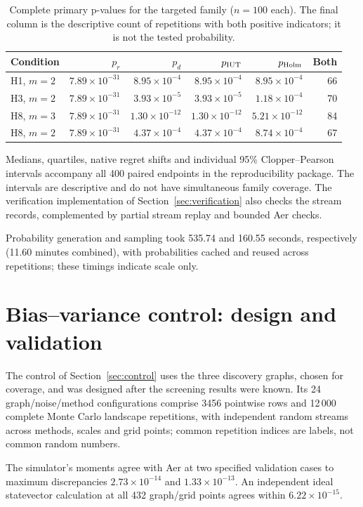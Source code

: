 \begin{table}[htbp]\centering\small
\caption{Complete primary p-values for the targeted family ($n=100$ each). The final column is the descriptive count of repetitions with both positive indicators; it is not the tested probability.}
\setlength{\tabcolsep}{3pt}
\begin{tabular}{lrrrrr}\hline
Condition & $p_r$ & $p_d$ & $p_{\rm IUT}$ & $p_{\rm Holm}$ & Both\\\hline
H1, $m=2$ & $7.89\times10^{-31}$ & $8.95\times10^{-4}$ & $8.95\times10^{-4}$ & $8.95\times10^{-4}$ & 66\\
H3, $m=2$ & $7.89\times10^{-31}$ & $3.93\times10^{-5}$ & $3.93\times10^{-5}$ & $1.18\times10^{-4}$ & 70\\
H8, $m=3$ & $7.89\times10^{-31}$ & $1.30\times10^{-12}$ & $1.30\times10^{-12}$ & $5.21\times10^{-12}$ & 84\\
H8, $m=2$ & $7.89\times10^{-31}$ & $4.37\times10^{-4}$ & $4.37\times10^{-4}$ & $8.74\times10^{-4}$ & 67\\
\hline\end{tabular}\end{table}

Medians, quartiles, native regret shifts and individual 95\% Clopper--Pearson intervals accompany all 400 paired endpoints in the reproducibility package. The intervals are descriptive and do not have simultaneous family coverage. The verification implementation of Section~\ref{sec:verification} also checks the stream records, complemented by partial stream replay and bounded Aer checks.

Probability generation and sampling took 535.74 and 160.55 seconds, respectively (11.60 minutes combined), with probabilities cached and reused across repetitions; these timings indicate scale only.

\section{Bias--variance control: design and validation}\label{app:control}
The control of Section~\ref{sec:control} uses the three discovery graphs, chosen for coverage, and was designed after the screening results were known. Its 24 graph/noise/method configurations comprise 3456 pointwise rows and 12\,000 complete Monte Carlo landscape repetitions, with independent random streams across methods, scales and grid points; common repetition indices are labels, not common random numbers.

The simulator's moments agree with Aer at two specified validation cases to maximum discrepancies $2.73\times10^{-14}$ and $1.33\times10^{-13}$. An independent ideal statevector calculation at all 432 graph/grid points agrees within $6.22\times10^{-15}$.

